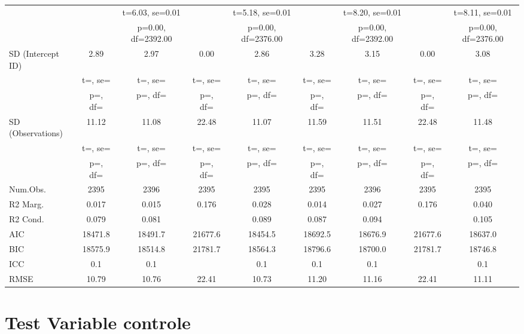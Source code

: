 \documentclass[]{report}
\begin{document}
\begin{table}
{\begin{tabular}[t]{lcccccccc}
		&  & t=\num{6.03}, se=\num{0.01} &  & t=\num{5.18}, se=\num{0.01} &  & t=\num{8.20}, se=\num{0.01} &  & t=\num{8.11}, se=\num{0.01}\\
		&  & p=\num{0.00}, df=\num{2392.00} &  & p=\num{0.00}, df=\num{2376.00} &  & p=\num{0.00}, df=\num{2392.00} &  & p=\num{0.00}, df=\num{2376.00}\\
		SD (Intercept ID) & \num{2.89} & \num{2.97} & \num{0.00} & \num{2.86} & \num{3.28} & \num{3.15} & \num{0.00} & \num{3.08}\\
		& t=, se= & t=, se= & t=, se= & t=, se= & t=, se= & t=, se= & t=, se= & t=, \vphantom{1} se=\\
		& p=, df= & p=, df= & p=, df= & p=, df= & p=, df= & p=, df= & p=, df= & p=, \vphantom{1} df=\\
		SD (Observations) & \num{11.12} & \num{11.08} & \num{22.48} & \num{11.07} & \num{11.59} & \num{11.51} & \num{22.48} & \num{11.48}\\
		& t=, se= & t=, se= & t=, se= & t=, se= & t=, se= & t=, se= & t=, se= & t=, se=\\
		& p=, df= & p=, df= & p=, df= & p=, df= & p=, df= & p=, df= & p=, df= & p=, df=\\
		\midrule
		Num.Obs. & \num{2395} & \num{2396} & \num{2395} & \num{2395} & \num{2395} & \num{2396} & \num{2395} & \num{2395}\\
		R2 Marg. & \num{0.017} & \num{0.015} & \num{0.176} & \num{0.028} & \num{0.014} & \num{0.027} & \num{0.176} & \num{0.040}\\
		R2 Cond. & \num{0.079} & \num{0.081} &  & \num{0.089} & \num{0.087} & \num{0.094} &  & \num{0.105}\\
		AIC & \num{18471.8} & \num{18491.7} & \num{21677.6} & \num{18454.5} & \num{18692.5} & \num{18676.9} & \num{21677.6} & \num{18637.0}\\
		BIC & \num{18575.9} & \num{18514.8} & \num{21781.7} & \num{18564.3} & \num{18796.6} & \num{18700.0} & \num{21781.7} & \num{18746.8}\\
		ICC & \num{0.1} & \num{0.1} &  & \num{0.1} & \num{0.1} & \num{0.1} &  & \num{0.1}\\
		RMSE & \num{10.79} & \num{10.76} & \num{22.41} & \num{10.73} & \num{11.20} & \num{11.16} & \num{22.41} & \num{11.11}\\
		\bottomrule
	\end{tabular}}
\end{table}



\part{Test Variable controle}
\end{document}
